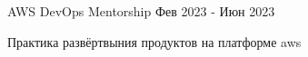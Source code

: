 

\begin{cventries}



    \cventry
    {} %
    {AWS DevOps Mentorship} %
    {} %
    {Фев 2023 - Июн 2023} %
    {
      \begin{cvitems} %
          Практика развёртвыния продуктов на платформе aws
      \end{cvitems}
    }


\end{cventries}

